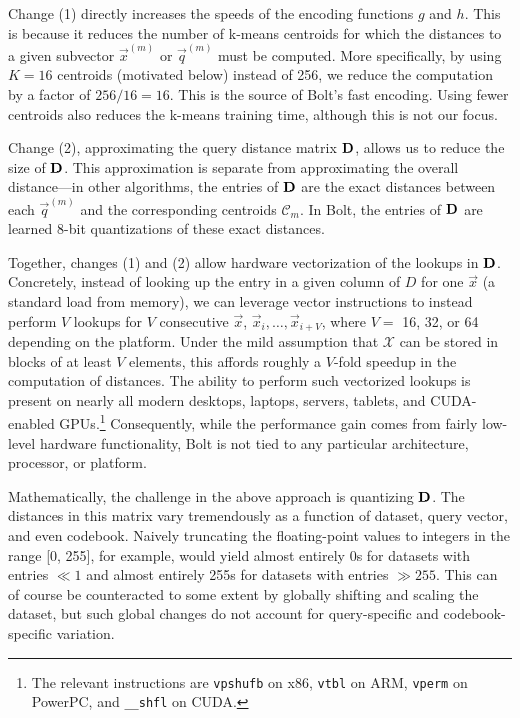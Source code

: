 Change (1) directly increases the speeds of the encoding functions $g$ and $h$. This is because it reduces the number of k-means centroids for which the distances to a given subvector $\vec{x}^{(m)}$ or $\vec{q}^{(m)}$ must be computed. More specifically, by using $K = 16$ centroids (motivated below) instead of 256, we reduce the computation by a factor of $256 / 16 = 16$. This is the source of Bolt's fast encoding. Using fewer centroids also reduces the k-means training time, although this is not our focus.

Change (2), approximating the query distance matrix $\mathbf{D}$, allows us to reduce the size of $\mathbf{D}$. This approximation is separate from approximating the overall distance---in other algorithms, the entries of $\mathbf{D}$ are the exact distances between each $\vec{q}^{(m)}$ and the corresponding centroids $\mathcal{C}_m$. In Bolt, the entries of $\mathbf{D}$ are learned 8-bit quantizations of these exact distances.

Together, changes (1) and (2) allow hardware vectorization of the lookups in $\mathbf{D}$. Concretely, instead of looking up the entry in a given column of $D$ for one $\vec{x}$ (a standard load from memory), we can leverage vector instructions to instead perform $V$ lookups for $V$ consecutive $\vec{x}$, $\vec{x}_i,\ldots,\vec{x}_{i+V}$, where $V = $ 16, 32, or 64 depending on the platform. Under the mild assumption that $\mathcal{X}$ can be stored in blocks of at least $V$ elements, this affords roughly a $V$-fold speedup in the computation of distances. The ability to perform such vectorized lookups is present on nearly all modern desktops, laptops, servers, tablets, and CUDA-enabled GPUs.\footnote{The relevant instructions are \texttt{vpshufb} on x86, \texttt{vtbl} on ARM, \texttt{vperm} on PowerPC, and \texttt{\_\_shfl} on CUDA.} Consequently, while the performance gain comes from fairly low-level hardware functionality, Bolt is not tied to any particular architecture, processor, or platform.

Mathematically, the challenge in the above approach is quantizing $\mathbf{D}$. The distances in this matrix vary tremendously as a function of dataset, query vector, and even codebook. Naively truncating the floating-point values to integers in the range [0, 255], for example, would yield almost entirely 0s for datasets with entries $ \ll 1$ and almost entirely 255s for datasets with entries $ \gg 255$. This can of course be counteracted to some extent by globally shifting and scaling the dataset, but such global changes do not account for query-specific and codebook-specific variation.

